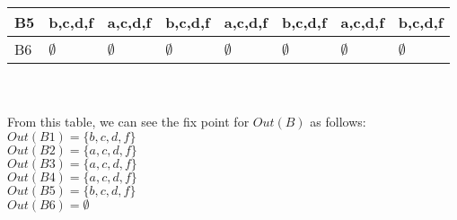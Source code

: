 \documentclass[12pt,fleqn]{article}		%
\begin{document}
\begin{enumerate}
\begin{tabularx}{\textwidth}{| l || X | X || X | X || X | X || X |}
\hline
B5 & b,c,d,f & a,c,d,f & b,c,d,f & a,c,d,f & b,c,d,f & a,c,d,f & b,c,d,f\\
\hline
B6 & $\emptyset$ & $\emptyset$ & $\emptyset$ & $\emptyset$ & $\emptyset$ & $\emptyset$ & $\emptyset$\\
\hline
\end{tabularx}
\\\\
From this table, we can see the fix point for $Out(B)$ as follows:\\
$Out(B1) = \{b, c, d, f\}$\\
$Out(B2) = \{a, c, d, f\}$\\
$Out(B3) = \{a, c, d, f\}$\\
$Out(B4) = \{a, c, d, f\}$\\
$Out(B5) = \{b, c, d, f\}$\\
$Out(B6) = \emptyset$


\end{enumerate}
\end{document}

